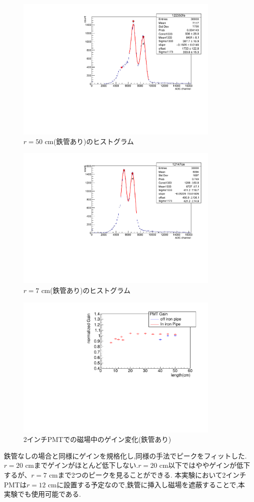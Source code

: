 \begin{figure}[h]
	\centering
		\includegraphics[clip,angle=-90,width=10cm]{fig/iguchi/122350fe.pdf}
	\caption{$r=50$ cm(鉄管あり)のヒストグラム}
	\label{hist50fe}
\end{figure}
\begin{figure}[h]
	\centering
		\includegraphics[clip,angle=-90,width=10cm]{fig/iguchi/12147on.pdf}
	\caption{$r=7$ cm(鉄管あり)のヒストグラム}
	\label{hist7fe}
\end{figure}

\begin{figure}[h]
	\centering
		\includegraphics[angle=-90,width=10cm]{fig/iguchi/bigPMTfit.pdf}
	\caption{2インチPMTでの磁場中のゲイン変化(鉄管あり)}
	\label{bigPMTfit}
\end{figure}
鉄管なしの場合と同様にゲインを規格化し,同様の手法でピークをフィットした.$r=20$ cmまでゲインがほとんど低下しない.$r=20$ cm以下ではややゲインが低下するが、$r=7$ cmまで2つのピークを見ることができる.
本実験において2インチPMTは$r=12$ cmに設置する予定なので,鉄管に挿入し磁場を遮蔽することで,本実験でも使用可能である.


